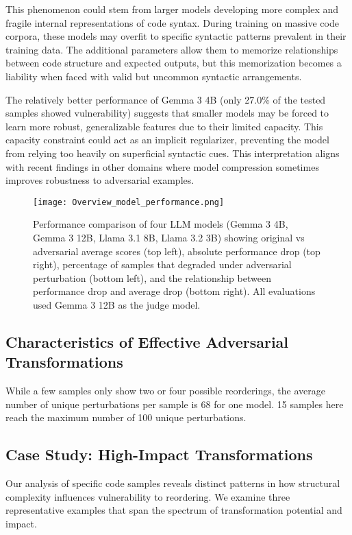 \documentclass[%
thesis=student,%
coverpage=false,%
titlepage=false,%
headmarks=true, %
english,%
font=libertine, %
math=newpxtx, %
BCOR=5mm,%
coverBCOR=11mm%
]{tum-templates/book/tumbook}
\begin{document}
This phenomenon could stem from larger models developing more complex and fragile internal representations of code syntax. During training on massive code corpora, these models may overfit to specific syntactic patterns prevalent in their training data. The additional parameters allow them to memorize relationships between code structure and expected outputs, but this memorization becomes a liability when faced with valid but uncommon syntactic arrangements.

The relatively better performance of Gemma 3 4B (only 27.0\% of the tested samples showed vulnerability) suggests that smaller models may be forced to learn more robust, generalizable features due to their limited capacity. This capacity constraint could act as an implicit regularizer, preventing the model from relying too heavily on superficial syntactic cues. This interpretation aligns with recent findings in other domains where model compression sometimes improves robustness to adversarial examples.


\begin{figure}[htbp]
    \centering
    \texttt{[image: Overview\_model\_performance.png]}
    \caption{Performance comparison of four LLM models (Gemma 3 4B, Gemma 3 12B, Llama 3.1 8B, Llama 3.2 3B) showing original vs adversarial average scores (top left), absolute performance drop (top right), percentage of samples that degraded under adversarial perturbation (bottom left), and the relationship between performance drop and average drop (bottom right). All evaluations used Gemma 3 12B as the judge model.}
    \label{fig:Overview_model_performance}
\end{figure}


\subsection{Characteristics of Effective Adversarial Transformations}

While a few samples only show two or four possible reorderings, the average number of unique perturbations per sample is 68 for one model. 15 samples here reach the maximum number of 100 unique perturbations.

\subsection{Case Study: High-Impact Transformations}

Our analysis of specific code samples reveals distinct patterns in how structural complexity influences vulnerability to reordering. We examine three representative examples that span the spectrum of transformation potential and impact.
\end{document}
